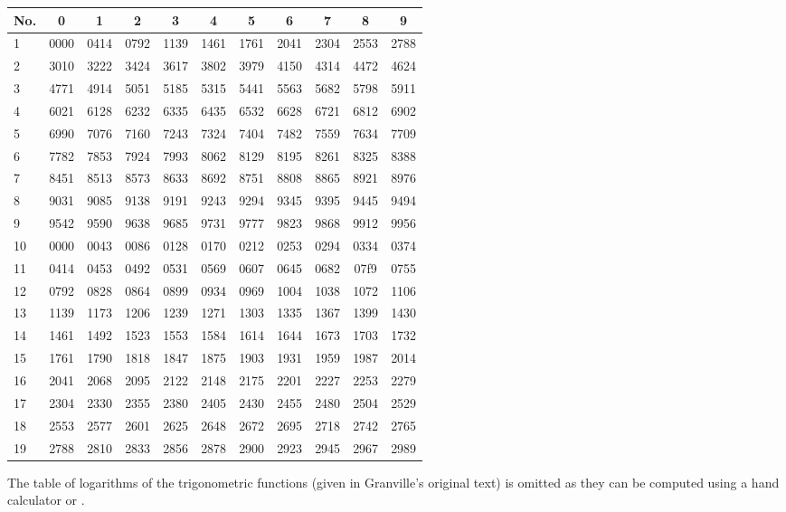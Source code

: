 \begin{center}
\begin{tabular}{lcccccccccc}
No. &  0   &  1   &  2   &  3   &  4   &  5   &  6   &  7   &  8   &  9   \\  \hline
1   & 0000 & 0414 & 0792 & 1139 & 1461 & 1761 & 2041 & 2304 & 2553 & 2788 \\
2   & 3010 & 3222 & 3424 & 3617 & 3802 & 3979 & 4150 & 4314 & 4472 & 4624 \\
3   & 4771 & 4914 & 5051 & 5185 & 5315 & 5441 & 5563 & 5682 & 5798 & 5911 \\
4   & 6021 & 6128 & 6232 & 6335 & 6435 & 6532 & 6628 & 6721 & 6812 & 6902 \\
5   & 6990 & 7076 & 7160 & 7243 & 7324 & 7404 & 7482 & 7559 & 7634 & 7709 \\
6   & 7782 & 7853 & 7924 & 7993 & 8062 & 8129 & 8195 & 8261 & 8325 & 8388 \\
7   & 8451 & 8513 & 8573 & 8633 & 8692 & 8751 & 8808 & 8865 & 8921 & 8976 \\
8   & 9031 & 9085 & 9138 & 9191 & 9243 & 9294 & 9345 & 9395 & 9445 & 9494 \\
9   & 9542 & 9590 & 9638 & 9685 & 9731 & 9777 & 9823 & 9868 & 9912 & 9956 \\
10  & 0000 & 0043 & 0086 & 0128 & 0170 & 0212 & 0253 & 0294 & 0334 & 0374 \\
11  & 0414 & 0453 & 0492 & 0531 & 0569 & 0607 & 0645 & 0682 & 07f9 & 0755 \\
12  & 0792 & 0828 & 0864 & 0899 & 0934 & 0969 & 1004 & 1038 & 1072 & 1106 \\
13  & 1139 & 1173 & 1206 & 1239 & 1271 & 1303 & 1335 & 1367 & 1399 & 1430 \\
14  & 1461 & 1492 & 1523 & 1553 & 1584 & 1614 & 1644 & 1673 & 1703 & 1732 \\
15  & 1761 & 1790 & 1818 & 1847 & 1875 & 1903 & 1931 & 1959 & 1987 & 2014 \\
16  & 2041 & 2068 & 2095 & 2122 & 2148 & 2175 & 2201 & 2227 & 2253 & 2279 \\
17  & 2304 & 2330 & 2355 & 2380 & 2405 & 2430 & 2455 & 2480 & 2504 & 2529 \\
18  & 2553 & 2577 & 2601 & 2625 & 2648 & 2672 & 2695 & 2718 & 2742 & 2765 \\
19  & 2788 & 2810 & 2833 & 2856 & 2878 & 2900 & 2923 & 2945 & 2967 & 2989 \\
\end{tabular}
\end{center}

The table of logarithms of the trigonometric functions (given in Granville's original text) is omitted as they can be computed using a hand calculator or \SAGE.

